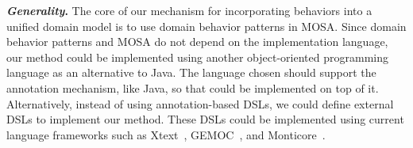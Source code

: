 \textbf{\textit{Generality}.} The core of our mechanism for incorporating behaviors into a unified domain model is to use domain behavior patterns in MOSA. Since domain behavior patterns and MOSA do not depend on the implementation language, our method could be implemented using another object-oriented programming language as an alternative to Java. The language chosen should support the annotation mechanism, like Java, so that \agldcsl could be implemented on top of it. Alternatively, instead of using annotation-based DSLs, we could define external DSLs to implement our method. These DSLs could be implemented using current language frameworks such as Xtext~\cite{bettini_implementing_2016}, GEMOC~\cite{combemale_language_2017}, and Monticore~\cite{rumpe_monticore_2021}.



